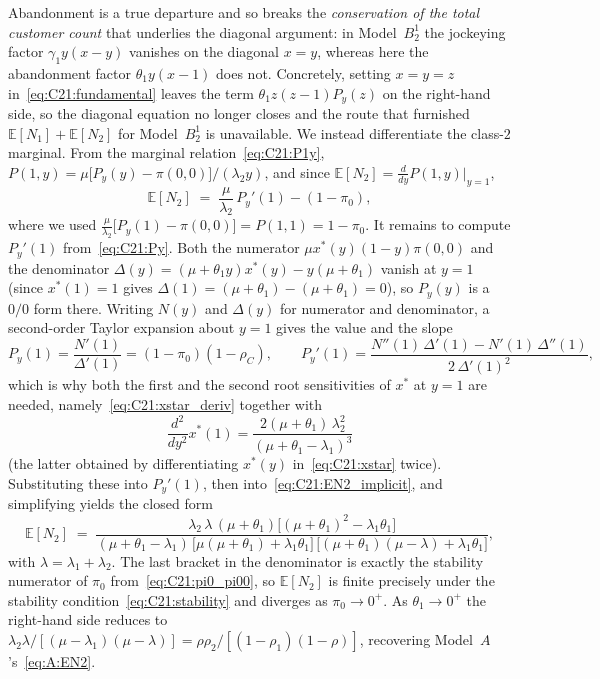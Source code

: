 Abandonment is a true departure and so breaks the \emph{conservation of the total customer
count} that underlies the diagonal argument: in Model~$B_2^1$ the jockeying factor
$\gamma_1 y(x-y)$ vanishes on the diagonal $x=y$, whereas here the abandonment factor
$\theta_1 y(x-1)$ does not. Concretely, setting $x=y=z$ in~\eqref{eq:C21:fundamental} leaves
the term $\theta_1 z(z-1)P_y(z)$ on the right-hand side, so the diagonal equation no longer
closes and the route that furnished $\mathbb{E}[N_1]+\mathbb{E}[N_2]$ for Model~$B_2^1$ is
unavailable. We instead differentiate the class-$2$ marginal. From the
marginal relation~\eqref{eq:C21:P1y}, $P(1,y)=\mu\bigl[P_y(y)-\pi(0,0)\bigr]/(\lambda_2 y)$,
and since $\mathbb{E}[N_2]=\tfrac{d}{dy}P(1,y)\big|_{y=1}$,
\begin{equation}
    \mathbb{E}[N_2]
    \;=\; \frac{\mu}{\lambda_2}\,P_y'(1) - (1-\pi_0),
    \label{eq:C21:EN2_implicit}
\end{equation}
where we used $\tfrac{\mu}{\lambda_2}\bigl[P_y(1)-\pi(0,0)\bigr]=P(1,1)=1-\pi_0$. It remains
to compute $P_y'(1)$ from~\eqref{eq:C21:Py}. Both the numerator $\mu x^*(y)(1-y)\pi(0,0)$ and
the denominator $\Delta(y)=(\mu+\theta_1 y)x^*(y)-y(\mu+\theta_1)$ vanish at $y=1$ (since
$x^*(1)=1$ gives $\Delta(1)=(\mu+\theta_1)-(\mu+\theta_1)=0$), so $P_y(y)$ is a $0/0$ form
there. Writing $N(y)$ and $\Delta(y)$ for numerator and denominator, a second-order Taylor
expansion about $y=1$ gives the value and the slope
\begin{equation*}
    P_y(1) = \frac{N'(1)}{\Delta'(1)} = (1-\pi_0)(1-\rho_C),
    \qquad
    P_y'(1) = \frac{N''(1)\,\Delta'(1) - N'(1)\,\Delta''(1)}{2\,\Delta'(1)^2},
\end{equation*}
which is why both the first and the second root sensitivities of $x^*$ at $y=1$ are needed,
namely~\eqref{eq:C21:xstar_deriv} together with
\begin{equation*}
    \frac{d^2}{dy^2}x^*(1) = \frac{2(\mu+\theta_1)\,\lambda_2^2}{(\mu+\theta_1-\lambda_1)^3}
\end{equation*}
(the latter obtained by differentiating $x^*(y)$ in~\eqref{eq:C21:xstar} twice).
Substituting these into $P_y'(1)$, then into~\eqref{eq:C21:EN2_implicit}, and simplifying
yields the closed form
\begin{equation}
    \mathbb{E}[N_2]
    \;=\; \frac{\lambda_2\,\lambda\,(\mu+\theta_1)\bigl[(\mu+\theta_1)^2-\lambda_1\theta_1\bigr]}
               {(\mu+\theta_1-\lambda_1)\,
                \bigl[\mu(\mu+\theta_1)+\lambda_1\theta_1\bigr]\,
                \bigl[(\mu+\theta_1)(\mu-\lambda)+\lambda_1\theta_1\bigr]},
    \label{eq:C21:EN2}
\end{equation}
with $\lambda=\lambda_1+\lambda_2$. The last bracket in the denominator is exactly the
stability numerator of $\pi_0$ from~\eqref{eq:C21:pi0_pi00}, so $\mathbb{E}[N_2]$ is finite
precisely under the stability condition~\eqref{eq:C21:stability} and diverges as
$\pi_0\to0^+$. As $\theta_1\to0^+$ the right-hand side reduces to
$\lambda_2\lambda/[(\mu-\lambda_1)(\mu-\lambda)]=\rho\rho_2/[(1-\rho_1)(1-\rho)]$, recovering
Model~$A$'s~\eqref{eq:A:EN2}.

